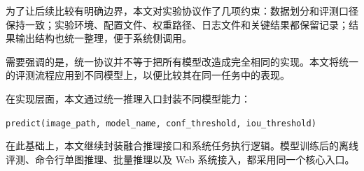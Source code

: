 为了让后续比较有明确边界，本文对实验协议作了几项约束：数据划分和评测口径保持一致；实验环境、配置文件、权重路径、日志文件和关键结果都保留记录；结果输出结构也统一整理，便于系统侧调用。

需要强调的是，统一协议并不等于把所有模型改造成完全相同的实现。本文将统一的评测流程应用到不同模型上，以便比较其在同一任务中的表现。

在实现层面，本文通过统一推理入口封装不同模型能力：

\texttt{predict(image\_path, model\_name, conf\_threshold, iou\_threshold)}

在此基础上，本文继续封装融合推理接口和系统任务执行逻辑。模型训练后的离线评测、命令行单图推理、批量推理以及 Web 系统接入，都采用同一个核心入口。
